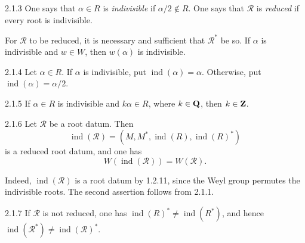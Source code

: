 \begin{definition}{2.1.3}\label{XXI.2.1.3}
One says that $\alpha\in R$ is \emph{indivisible} if $\alpha/2\notin R$. One says that $\mathcal R$ is \emph{reduced} if every root is indivisible.
\end{definition}
For $\mathcal R$ to be reduced, it is necessary and sufficient that $\mathcal R^*$ be so. If $\alpha$ is indivisible and $w\in W$, then $w(\alpha)$ is indivisible.
\begin{definition}{2.1.4}\label{XXI.2.1.4}
Let $\alpha\in R$. If $\alpha$ is indivisible, put $\operatorname{ind}(\alpha)=\alpha$. Otherwise, put $\operatorname{ind}(\alpha)=\alpha/2$.
\end{definition}
\begin{corollary}{2.1.5}\label{XXI.2.1.5}
If $\alpha\in R$ is indivisible and $k\alpha\in R$, where $k\in\mathbf{Q}$, then $k\in\mathbf{Z}$.
\end{corollary}
\begin{proposition}{2.1.6}\label{XXI.2.1.6}
Let $\mathcal R$ be a root datum. Then
\[
\operatorname{ind}(\mathcal R)=(M,M^*,\operatorname{ind}(R),\operatorname{ind}(R)^*)
\]
is a reduced root datum, and one has
\[
W(\operatorname{ind}(\mathcal R))=W(\mathcal R).
\]
\end{proposition}
Indeed, $\operatorname{ind}(\mathcal R)$ is a root datum by 1.2.11, since the Weyl group permutes the indivisible roots. The second assertion follows from 2.1.1.
\begin{remark}{2.1.7}\label{XXI.2.1.7}
If $\mathcal R$ is not reduced, one has $\operatorname{ind}(R)^*\ne\operatorname{ind}(R^*)$, and hence $\operatorname{ind}(\mathcal R^*)\ne\operatorname{ind}(\mathcal R)^*$.
\end{remark}

